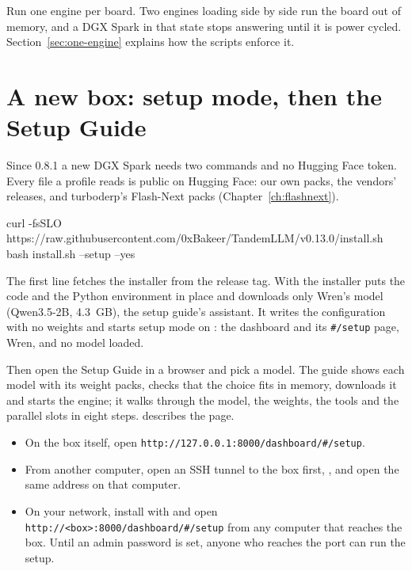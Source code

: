 Run one engine per board. Two engines loading side by side run the board out of memory, and a DGX Spark in that state stops answering until it is power cycled. Section~\ref{sec:one-engine} explains how the scripts enforce it.

\section{A new box: setup mode, then the Setup Guide}\label{sec:new-box}

Since 0.8.1 a new DGX Spark needs two commands and no Hugging Face token. Every file a profile reads is public on Hugging Face: our own packs, the vendors' releases, and turboderp's Flash-Next packs (Chapter~\ref{ch:flashnext}).

\begin{shell}
curl -fsSLO https://raw.githubusercontent.com/0xBakeer/TandemLLM/v0.13.0/install.sh
bash install.sh --setup --yes
\end{shell}

The first line fetches the installer from the release tag. With  the installer puts the code and the Python environment in place and downloads only Wren's model (Qwen3.5-2B, 4.3~GB), the setup guide's assistant. It writes the configuration with no weights and starts setup mode on : the dashboard and its \texttt{\#/setup} page, Wren, and no model loaded.

Then open the Setup Guide in a browser and pick a model. The guide shows each model with its weight packs, checks that the choice fits in memory, downloads it and starts the engine; it walks through the model, the weights, the tools and the parallel slots in eight steps.  describes the page.

\begin{itemize}
\item On the box itself, open \texttt{http://127.0.0.1:8000/dashboard/\#/setup}.
\item From another computer, open an SSH tunnel to the box first, , and open the same address on that computer.
\item On your network, install with  and open \texttt{http://<box>:8000/dashboard/\#/setup} from any computer that reaches the box. Until an admin password is set, anyone who reaches the port can run the setup.
\end{itemize}


